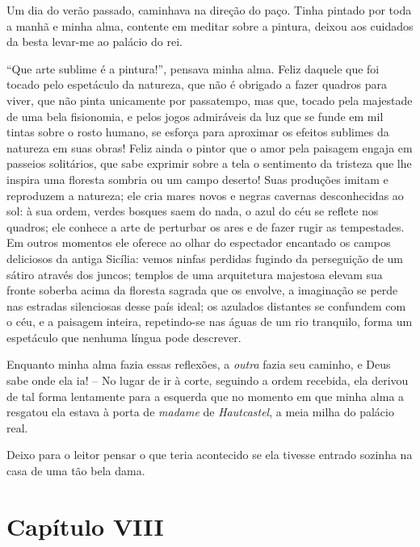  Um dia do verão passado, caminhava na direção do paço. Tinha pintado
por toda a manhã e minha alma, contente em meditar sobre a pintura,
deixou aos cuidados da besta levar-me ao palácio do rei.

 ``Que arte sublime é a pintura!'', pensava minha alma. Feliz daquele que
foi tocado pelo espetáculo da natureza, que não é obrigado a fazer
quadros para viver, que não pinta unicamente por passatempo, mas que,
tocado pela majestade de uma bela fisionomia, e pelos jogos admiráveis
da luz que se funde em mil tintas sobre o rosto humano, se esforça para
aproximar os efeitos sublimes da natureza em suas obras! Feliz ainda o
pintor que o amor pela paisagem engaja em passeios solitários, que sabe
exprimir sobre a tela o sentimento da tristeza que lhe inspira uma
floresta sombria ou um campo deserto! Suas produções imitam e
reproduzem a natureza; ele cria mares novos e negras cavernas
desconhecidas ao sol: à sua ordem, verdes bosques saem do nada, o azul
do céu se reflete nos quadros; ele conhece a arte de perturbar os ares
e de fazer rugir as tempestades. Em outros momentos ele oferece ao
olhar do espectador encantado os campos deliciosos da antiga Sicília:
vemos ninfas perdidas fugindo da perseguição de um sátiro através dos
juncos; templos de uma arquitetura majestosa elevam sua fronte soberba
acima da floresta sagrada que os envolve, a imaginação se perde nas
estradas silenciosas desse país ideal; os azulados distantes se
confundem com o céu, e a paisagem inteira, repetindo-se nas águas de um
rio tranquilo, forma um espetáculo que nenhuma língua pode descrever.

 Enquanto minha alma fazia essas reflexões, a \textit{outra} fazia seu
caminho, e Deus sabe onde ela ia! -- No lugar de ir à corte, seguindo
a ordem recebida, ela derivou de tal forma lentamente para a esquerda
que no momento em que minha alma a resgatou ela estava à porta de
\textit{madame} de \textit{Hautcastel}, a meia milha do palácio real.

 Deixo para o leitor pensar o que teria acontecido se ela tivesse
entrado sozinha na casa de uma tão bela dama. 

\section{Capítulo VIII}

